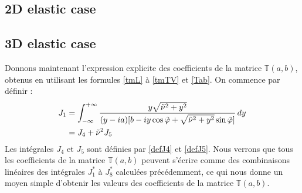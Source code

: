 \subsection{2D elastic case}
\label{finalT2D}
\subsection{3D elastic case}
\label{finalT3D}
Donnons maintenant l'expression explicite des coefficients de la matrice $\mathbb{T}(a,b)$, obtenus en utilisant les formules \eqref{tmL} à \eqref{tmTV} et \eqref{Tab}. 
On commence par définir :
\begin{equation}
\begin{split}
J_1&=\int_{-\infty}^{+\infty}\frac{y\sqrt{\tilde{\nu}^2+y^2}}{(y-ia)\lbrack b-iy\cos\tilde{\varphi}+\sqrt{\tilde{\nu}^2+y^2}\sin\tilde{\varphi}\rbrack}\,dy\\
&=J_4+\tilde{\nu}^2J_5
\end{split}
\label{defJ1}
\end{equation}
Les intégrales $J_4$ et $J_5$ sont définies par \eqref{defJ4} et \eqref{defJ5}.
Nous verrons que tous les coefficients de la matrice $\mathbb{T}(a,b)$ peuvent s'écrire comme des combinaisons linéaires des intégrales $J_1^*$ à $J_8^*$ calculées précédemment, ce qui nous donne un moyen simple d'obtenir les valeurs des coefficients de la matrice $\mathbb{T}(a,b)$.
